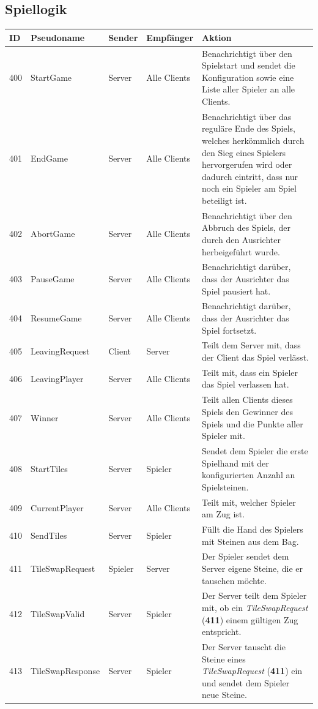 \documentclass[a4paper, 10pt]{article}
\begin{document}
\subsection{Spiellogik}
\begin{center}
	\begin{tabular}{| l | l | p{2.5cm} | p{2.5cm} | p{6cm} |}
		\hline
			ID & Pseudoname & Sender & Empfänger & Aktion \\
		\hline \hline
			400 & StartGame & Server & Alle Clients &
			Benachrichtigt über den Spielstart und sendet die Konfiguration sowie eine Liste aller Spieler an alle Clients.\\
		\hline
			401 & EndGame & Server & Alle Clients &
			Benachrichtigt über das reguläre Ende des Spiels, welches herkömmlich durch den Sieg eines Spielers
			hervorgerufen wird oder dadurch eintritt, dass nur noch ein Spieler am Spiel beteiligt ist. \\
		\hline
			402 & AbortGame & Server & Alle Clients &
			Benachrichtigt über den Abbruch des Spiels, der durch den Ausrichter herbeigeführt wurde. \\
		\hline
			403 & PauseGame & Server & Alle Clients &
			Benachrichtigt darüber, dass der Ausrichter das Spiel pausiert hat. \\
		\hline
			404 & ResumeGame & Server & Alle Clients &
			Benachrichtigt darüber, dass der Ausrichter das Spiel fortsetzt. \\
		\hline
			405 & LeavingRequest & Client & Server &
			Teilt dem Server mit, dass der Client das Spiel verlässt. \\
		\hline
			406 & LeavingPlayer & Server & Alle Clients &
			Teilt mit, dass ein Spieler das Spiel verlassen hat. \\
		\hline
			407 & Winner & Server & Alle Clients &
			Teilt allen Clients dieses Spiels den Gewinner des Spiels und die Punkte aller Spieler mit. \\
		\hline
			408 & StartTiles & Server & Spieler &
			Sendet dem Spieler die erste Spielhand mit der konfigurierten Anzahl an Spielsteinen. \\
		\hline
			409 & CurrentPlayer & Server & Alle Clients &
			Teilt mit, welcher Spieler am Zug ist. \\
		\hline
			410 & SendTiles & Server & Spieler &
			Füllt die Hand des Spielers mit Steinen aus dem Bag. \\
		\hline
			411 & TileSwapRequest & Spieler & Server &
			Der Spieler sendet dem Server eigene Steine, die er tauschen möchte. \\
		\hline
			412 & TileSwapValid & Server & Spieler &
			Der Server teilt dem Spieler mit, ob ein \textit{TileSwapRequest} (\textbf{411}) einem gültigen Zug entspricht.\\
		\hline
			413 & TileSwapResponse & Server & Spieler &
			Der Server tauscht die Steine eines \textit{TileSwapRequest} (\textbf{411}) ein und sendet dem Spieler
			neue Steine. \\
		\hline
	\end{tabular}
\end{center}
\end{document}
